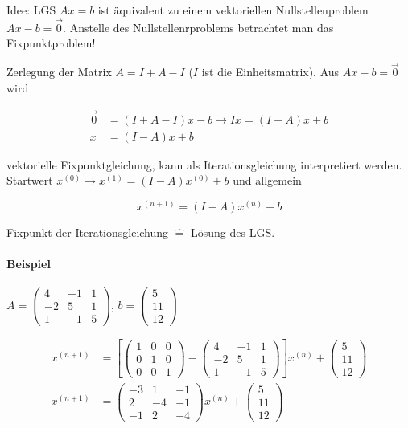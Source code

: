 \documentclass[a4paper,ngerman]{scrbook}
\begin{document}
Idee: LGS $Ax = b$ ist äquivalent zu einem vektoriellen Nullstellenproblem $Ax - b = \vec{0}$. Anstelle des Nullstellenrproblems betrachtet man das Fixpunktproblem!

Zerlegung der Matrix $A = I + A - I$ ($I$ ist die Einheitsmatrix). Aus $Ax - b = \vec{0}$ wird


\begin{align*}
  \vec{0} &= (I + A - I)x - b \to Ix = (I - A)x + b\\
  x &= (I-A)x + b
\end{align*}

vektorielle Fixpunktgleichung, kann als Iterationsgleichung interpretiert werden. Startwert $x^{(0)} \to x^{(1)} = (I-A)x^{(0)} + b$ und allgemein

\[
x^{(n+1)} = (I-A)x^{(n)} + b
\]

Fixpunkt der Iterationsgleichung $\hat{=}$ Lösung des LGS.

\paragraph{Beispiel}

$A =
\begin{pmatrix}
  4 & -1 & 1\\
  -2 & 5 & 1\\
  1 & -1 & 5
\end{pmatrix}
$, $b =
\begin{pmatrix}
  5\\ 11\\ 12
\end{pmatrix}
$


\begin{align*}
  x^{(n+1)} &= \left[
    \begin{pmatrix}
      1 & 0 & 0\\ 0 & 1 & 0\\ 0 & 0 & 1
    \end{pmatrix}
    -
    \begin{pmatrix}
      4 & -1 & 1\\ -2 & 5 & 1\\ 1 & -1 & 5
    \end{pmatrix}
  \right]x^{(n)} +
  \begin{pmatrix}
    5 \\ 11\\ 12
  \end{pmatrix}\\
  x^{(n+1)} &=
  \begin{pmatrix}
    -3 & 1 & -1\\ 2 & -4 & -1\\ -1 & 2 & -4
  \end{pmatrix} x^{(n)} +
  \begin{pmatrix}
    5 \\ 11\\ 12
  \end{pmatrix}
\end{align*}
\end{document}
